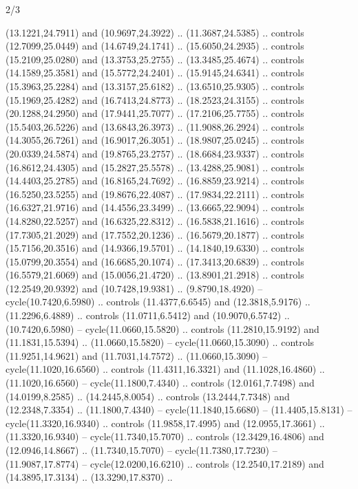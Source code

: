 \begin{flagdescription}{2/3}
\begin{scope}[yshift=\flagwidth,scale=\flagwidth/1241.93737]
\begin{scope}[y=-1mm, x=1mm,draw=gold,fill=blue,line join=miter,miter limit=4,line width=1.8\lw]
\begin{scope}[y=1mm, x=1mm, yscale=-1,shift={(573.68mm+\str,145.75)}]
\begin{scope}[scale=1.35,shift={(-9,-3)}]
\begin{scope}[scale=0.55]
\begin{scope}[scale=1.333]
    (13.1221,24.7911) and (10.9697,24.3922) .. (11.3687,24.5385) .. controls
    (12.7099,25.0449) and (14.6749,24.1741) .. (15.6050,24.2935) .. controls
    (15.2109,25.0280) and (13.3753,25.2755) .. (13.3485,25.4674) .. controls
    (14.1589,25.3581) and (15.5772,24.2401) .. (15.9145,24.6341) .. controls
    (15.3963,25.2284) and (13.3157,25.6182) .. (13.6510,25.9305) .. controls
    (15.1969,25.4282) and (16.7413,24.8773) .. (18.2523,24.3155) .. controls
    (20.1288,24.2950) and (17.9441,25.7077) .. (17.2106,25.7755) .. controls
    (15.5403,26.5226) and (13.6843,26.3973) .. (11.9088,26.2924) .. controls
    (14.3055,26.7261) and (16.9017,26.3051) .. (18.9807,25.0245) .. controls
    (20.0339,24.5874) and (19.8765,23.2757) .. (18.6684,23.9337) .. controls
    (16.8612,24.4305) and (15.2827,25.5578) .. (13.4288,25.9081) .. controls
    (14.4403,25.2785) and (16.8165,24.7692) .. (16.8859,23.9214) .. controls
    (16.5250,23.5255) and (19.8676,22.4087) .. (17.9834,22.2111) .. controls
    (16.6327,21.9716) and (14.4556,23.3499) .. (13.6665,22.9094) .. controls
    (14.8280,22.5257) and (16.6325,22.8312) .. (16.5838,21.1616) .. controls
    (17.7305,21.2029) and (17.7552,20.1236) .. (16.5679,20.1877) .. controls
    (15.7156,20.3516) and (14.9366,19.5701) .. (14.1840,19.6330) .. controls
    (15.0799,20.3554) and (16.6685,20.1074) .. (17.3413,20.6839) .. controls
    (16.5579,21.6069) and (15.0056,21.4720) .. (13.8901,21.2918) .. controls
    (12.2549,20.9392) and (10.7428,19.9381) .. (9.8790,18.4920) --
    cycle(10.7420,6.5980) .. controls (11.4377,6.6545) and (12.3818,5.9176) ..
    (11.2296,6.4889) .. controls (11.0711,6.5412) and (10.9070,6.5742) ..
    (10.7420,6.5980) -- cycle(11.0660,15.5820) .. controls (11.2810,15.9192) and
    (11.1831,15.5394) .. (11.0660,15.5820) -- cycle(11.0660,15.3090) .. controls
    (11.9251,14.9621) and (11.7031,14.7572) .. (11.0660,15.3090) --
    cycle(11.1020,16.6560) .. controls (11.4311,16.3321) and (11.1028,16.4860) ..
    (11.1020,16.6560) -- cycle(11.1800,7.4340) .. controls (12.0161,7.7498) and
    (14.0199,8.2585) .. (14.2445,8.0054) .. controls (13.2444,7.7348) and
    (12.2348,7.3354) .. (11.1800,7.4340) -- cycle(11.1840,15.6680) --
    (11.4405,15.8131) -- cycle(11.3320,16.9340) .. controls (11.9858,17.4995) and
    (12.0955,17.3661) .. (11.3320,16.9340) -- cycle(11.7340,15.7070) .. controls
    (12.3429,16.4806) and (12.0946,14.8667) .. (11.7340,15.7070) --
    cycle(11.7380,17.7230) -- (11.9087,17.8774) -- cycle(12.0200,16.6210) ..
    controls (12.2540,17.2189) and (14.3895,17.3134) .. (13.3290,17.8370) ..

\end{scope}
\end{scope}
\end{scope}
\end{scope}
\end{scope}
\end{scope}
\end{flagdescription}
